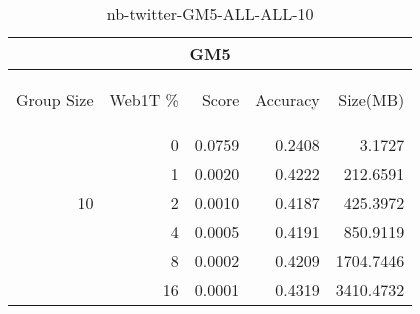\begin{center}
\begin{table}[htbp] 
 \begin{center}
\begin{tabular}{ | r | r | r | r | r |}
\hline
\multicolumn{5}{|c|}{GM5}\\
\hline
\begin{sideways}Group Size\end{sideways} & \begin{sideways}Web1T \%\end{sideways} & \begin{sideways}Score\end{sideways} & \begin{sideways}Accuracy\end{sideways} & \begin{sideways}Size(MB)\end{sideways}\\
\hline
\multirow{5}{*}{10}
 & 0 & 0.0759 & 0.2408 & 3.1727\\ \cline{2-5}
 & 1 & 0.0020 & 0.4222 & 212.6591\\ \cline{2-5}
 & 2 & 0.0010 & 0.4187 & 425.3972\\ \cline{2-5}
 & 4 & 0.0005 & 0.4191 & 850.9119\\ \cline{2-5}
 & 8 & 0.0002 & 0.4209 & 1704.7446\\ \cline{2-5}
 & 16 & 0.0001 & 0.4319 & 3410.4732\\ \cline{2-5}
\hline
\end{tabular}
\caption{nb-twitter-GM5-ALL-ALL-10}
\label{table:nb-twitter-GM5-ALL-ALL-10}
\end{center}
 \end{table}
\end{center}

